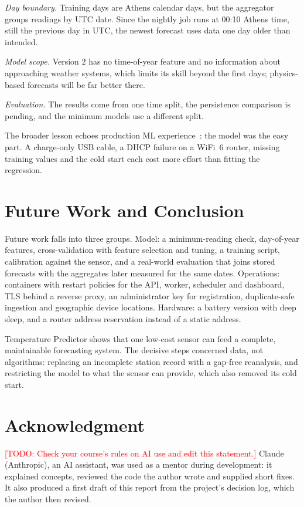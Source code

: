 \documentclass[conference]{IEEEtran}
\newcommand{\todo}[1]{\textcolor{red}{[TODO: #1]}}
\begin{document}
\textit{Day boundary.} Training days are Athens calendar days, but the aggregator groups readings by UTC date. Since the nightly job runs at 00:10 Athens time, still the previous day in UTC, the newest forecast uses data one day older than intended.

\textit{Model scope.} Version 2 has no time-of-year feature and no information about approaching weather systems, which limits its skill beyond the first days; physics-based forecasts will be far better there.

\textit{Evaluation.} The results come from one time split, the persistence comparison is pending, and the minimum models use a different split.

The broader lesson echoes production ML experience~\cite{b15}: the model was the easy part. A charge-only USB cable, a DHCP failure on a WiFi~6 router, missing training values and the cold start each cost more effort than fitting the regression.

\section{Future Work and Conclusion}
\label{sec:conclusion}

Future work falls into three groups. Model: a minimum-reading check, day-of-year features, cross-validation with feature selection and tuning, a training script, calibration against the sensor, and a real-world evaluation that joins stored forecasts with the aggregates later measured for the same dates. Operations: containers with restart policies for the API, worker, scheduler and dashboard, TLS behind a reverse proxy, an administrator key for registration, duplicate-safe ingestion and geographic device locations. Hardware: a battery version with deep sleep, and a router address reservation instead of a static address.

Temperature Predictor shows that one low-cost sensor can feed a complete, maintainable forecasting system. The decisive steps concerned data, not algorithms: replacing an incomplete station record with a gap-free reanalysis, and restricting the model to what the sensor can provide, which also removed its cold start.

\section*{Acknowledgment}
\todo{Check your course's rules on AI use and edit this statement.} Claude (Anthropic), an AI assistant, was used as a mentor during development: it explained concepts, reviewed the code the author wrote and supplied short fixes. It also produced a first draft of this report from the project's decision log, which the author then revised.
\end{document}
